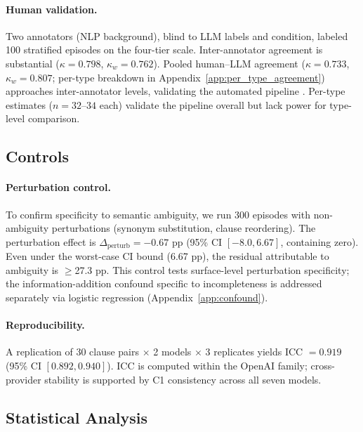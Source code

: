 \paragraph{Human validation.} Two annotators (NLP background), blind to LLM labels and condition, labeled 100 stratified episodes on the four-tier scale. Inter-annotator agreement is substantial ($\kappa = 0.798$, $\kappa_w = 0.762$). Pooled human--LLM agreement ($\kappa = 0.733$, $\kappa_w = 0.807$; per-type breakdown in Appendix~\ref{app:per_type_agreement}) approaches inter-annotator levels, validating the automated pipeline \citep{zheng_llm_judge_2024}. Per-type estimates ($n = 32$--$34$ each) validate the pipeline overall but lack power for type-level comparison.

\subsection{Controls}

\paragraph{Perturbation control.} To confirm specificity to semantic ambiguity, we run 300 episodes with non-ambiguity perturbations (synonym substitution, clause reordering). The perturbation effect is $\Delta_{\text{perturb}} = -0.67$ pp (95\% CI $[-8.0, 6.67]$, containing zero). Even under the worst-case CI bound (6.67 pp), the residual attributable to ambiguity is $\geq$27.3 pp. This control tests surface-level perturbation specificity; the information-addition confound specific to incompleteness is addressed separately via logistic regression (Appendix~\ref{app:confound}).

\paragraph{Reproducibility.} A replication of 30 clause pairs $\times$ 2 models $\times$ 3 replicates yields ICC $= 0.919$ (95\% CI $[0.892, 0.940]$). ICC is computed within the OpenAI family; cross-provider stability is supported by C1 consistency across all seven models.

\subsection{Statistical Analysis}

